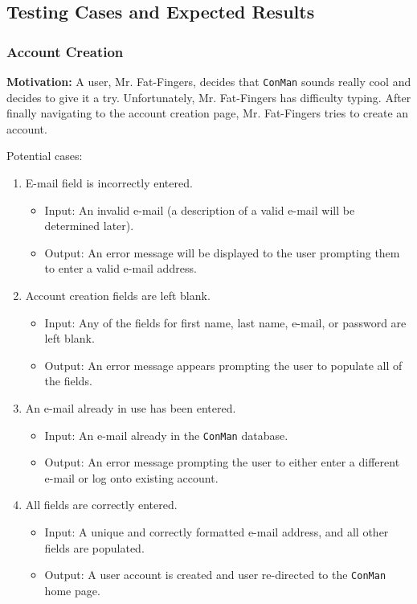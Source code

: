 \subsection{Testing Cases and Expected Results}
\subsubsection{Account Creation}
\textbf{Motivation:} A user, Mr. Fat-Fingers, decides that \texttt{ConMan}
sounds really cool and decides to give it a try. Unfortunately, Mr.
Fat-Fingers has difficulty typing. After finally navigating to the account
creation page, Mr. Fat-Fingers tries to create an account.

Potential cases:
\begin{enumerate}
    \item E-mail field is incorrectly entered.
        \begin{itemize}
            \item Input: An invalid e-mail (a description of a valid e-mail
will be determined later).
            \item Output: An error message will be displayed to the user
prompting them to enter a valid e-mail address.
        \end{itemize}
    \item Account creation fields are left blank.
        \begin{itemize}
            \item Input: Any of the fields for first name, last name, e-mail,
or password are left blank.
            \item Output: An error message appears prompting the user to
populate all of the fields.
        \end{itemize}
    \item An e-mail already in use has been entered.
        \begin{itemize}
            \item Input: An e-mail already in the \texttt{ConMan} database.
            \item Output: An error message prompting the user to either enter
a different e-mail or log onto existing account.
        \end{itemize}
    \item All fields are correctly entered.
        \begin{itemize}
            \item Input: A unique and correctly formatted e-mail address, and
all other fields are populated.
            \item Output: A user account is created and user re-directed to
the \texttt{ConMan} home page.
        \end{itemize}
\end{enumerate}

